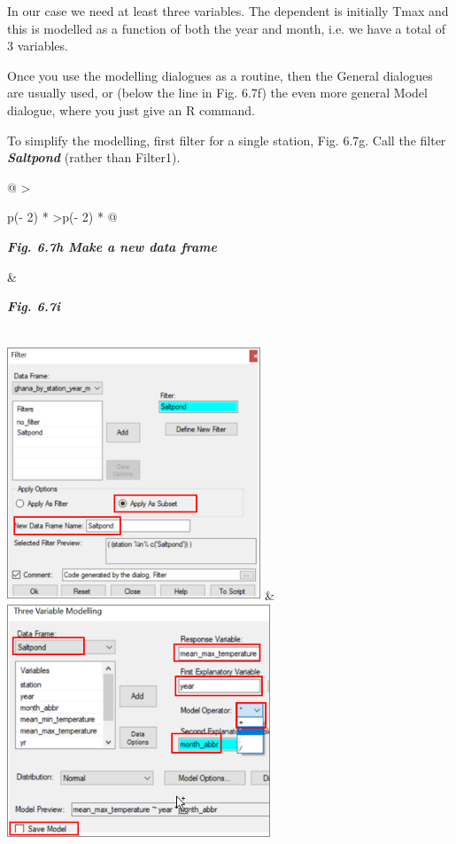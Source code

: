 \documentclass[
  letterpaper,
  DIV=11,
  numbers=noendperiod]{scrreprt}
\begin{document}
In our case we need at least three variables. The dependent is initially
Tmax and this is modelled as a function of both the year and month, i.e.
we have a total of 3 variables.

Once you use the modelling dialogues as a routine, then the General
dialogues are usually used, or (below the line in Fig. 6.7f) the even
more general Model dialogue, where you just give an R command.

To simplify the modelling, first filter for a single station, Fig. 6.7g.
Call the filter \textbf{\emph{Saltpond}} (rather than Filter1).

\begin{longtable}[]{@{}
  >{\raggedright\arraybackslash}p{(\columnwidth - 2\tabcolsep) * }
  >{\centering\arraybackslash}p{(\columnwidth - 2\tabcolsep) * }@{}}
\toprule\noalign{}
\begin{minipage}[b]{\linewidth}\raggedright
\textbf{\emph{Fig. 6.7h Make a new data frame}}
\end{minipage} & \begin{minipage}[b]{\linewidth}\centering
\textbf{\emph{Fig. 6.7i}}
\end{minipage} \\
\midrule\noalign{}
\endhead
\bottomrule\noalign{}
\endlastfoot
\includegraphics[width=2.98193in,height=2.99659in]{figures/Fig6.7h.png}
&
\includegraphics[width=3.08916in,height=2.72983in]{figures/Fig6.7i.png} \\
\end{longtable}
\end{document}
